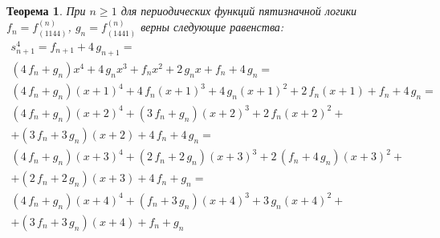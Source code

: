 \documentclass[bibliography=totoc, a4paper, 14pt]{extarticle}
\newtheorem{myth}{Теорема}
\begin{document}
\begin{myth} При $n \geqslant 1 $ для периодических функций пятизначной логики $f_n = f^{\left(n\right)}_{\left(1144\right)}$,
$g_n = f^{\left(n\right)}_{\left(1441\right)}$ верны следующие равенства:
$$\begin{array}{l}
s_{n+1}^4 = f_{n+1} + 4\,g_{n+1}=\\
 {\left(4 \, f_{n} + g_{n}\right)} x^{4} + 4 \, g_{n} x^{3} + f_{n} x^{2} + 2 \, g_{n} x + f_{n} + 4 \, g_{n} =\\
 {\left(4 \, f_{n} + g_{n}\right)} {\left(x + 1\right)}^{4} + 4 \, f_{n} {\left(x + 1\right)}^{3} + 4 \, g_{n} {\left(x + 1\right)}^{2} + 2 \, f_{n} {\left(x + 1\right)} + f_{n} + 4 \, g_{n} =\\
 {\left(4 \, f_{n} + g_{n}\right)} {\left(x + 2\right)}^{4} + {\left(3 \, f_{n} + g_{n}\right)} {\left(x + 2\right)}^{3} + 2 \, f_{n} {\left(x + 2\right)}^{2} +\\
 + {\left(3 \, f_{n} + 3 \, g_{n}\right)} {\left(x + 2\right)} + 4 \, f_{n} + 4 \, g_{n} =\\
 {\left(4 \, f_{n} + g_{n}\right)} {\left(x + 3\right)}^{4} + {\left(2 \, f_{n} + 2 \, g_{n}\right)} {\left(x + 3\right)}^{3} + 2 \, {\left(f_{n} + 4 \, g_{n}\right)} {\left(x + 3\right)}^{2} +\\
 + {\left(2 \, f_{n} + 2 \, g_{n}\right)} {\left(x + 3\right)} + 4 \, f_{n} + g_{n} =\\
 {\left(4 \, f_{n} + g_{n}\right)} {\left(x + 4\right)}^{4} + {\left(f_{n} + 3 \, g_{n}\right)} {\left(x + 4\right)}^{3} + 3 \, g_{n} {\left(x + 4\right)}^{2} +\\
 + {\left(3 \, f_{n} + 3 \, g_{n}\right)} {\left(x + 4\right)} + f_{n} + g_{n}\\
 \end{array}$$
\end{myth}
\end{document}

